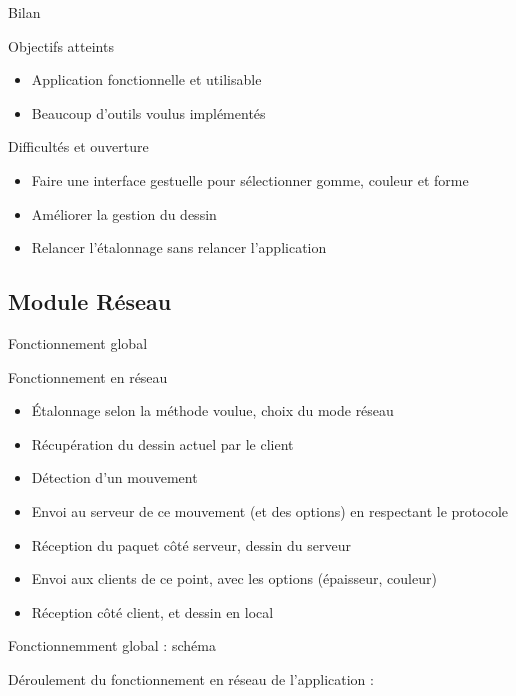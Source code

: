 \documentclass{beamer}
\begin{document}
		\begin{frame}{Bilan}
			\begin{exampleblock}{Objectifs atteints}
				\begin{itemize}
				\item Application fonctionnelle et utilisable
				\item Beaucoup d'outils voulus implémentés
				\end{itemize}
			\end{exampleblock}
			\pause
			\begin{alertblock}{Difficultés et ouverture}
				\begin{itemize}
				\item Faire une interface gestuelle pour sélectionner gomme, couleur et forme
				\item Améliorer la gestion du dessin
				\item Relancer l'étalonnage sans relancer l'application
				\end{itemize}
			\end{alertblock}
		\end{frame}

	\subsection{Module Réseau}
		\begin{frame}{Fonctionnement global}
			\begin{block}{Fonctionnement en réseau}
				\begin{itemize}
				\item Étalonnage selon la méthode voulue, choix du mode réseau
				\item Récupération du dessin actuel par le client
				\item Détection d'un mouvement
				\item Envoi au serveur de ce mouvement (et des options) en respectant le protocole
				\item Réception du paquet côté serveur, dessin du serveur
				\item Envoi aux clients de ce point, avec les options (épaisseur, couleur)
				\item Réception côté client, et dessin en local
				\end{itemize}
			\end{block}
		\end{frame}
		
		\begin{frame}{Fonctionnemment global : schéma}
		
		Déroulement du fonctionnement en réseau de l'application :
			\begin{center}
			\scalebox{0.5}{} 
			\end{center}
		\end{frame}
		
\end{document}
